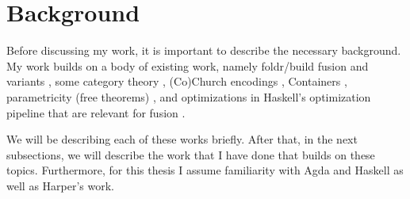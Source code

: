 
\section{Background}
Before discussing my work, it is important to describe the necessary background.
My work builds on a body of existing work, namely foldr/build fusion and variants \citep{Gill1993,Svenningsson2002,Coutts2007}, some category theory \citep{Ahrens2022}, (Co)Church encodings \citep{Harper2011}, Containers \citep{Abbott2005}, parametricity (free theorems) \citep{Wadler1989}, and optimizations in Haskell's optimization pipeline that are relevant for fusion \citep{Jones1996}.

We will be describing each of these works briefly.
After that, in the next subsections, we will describe the work that I have done that builds on these topics.
Furthermore, for this thesis I assume familiarity with Agda and Haskell as well as Harper's work.




